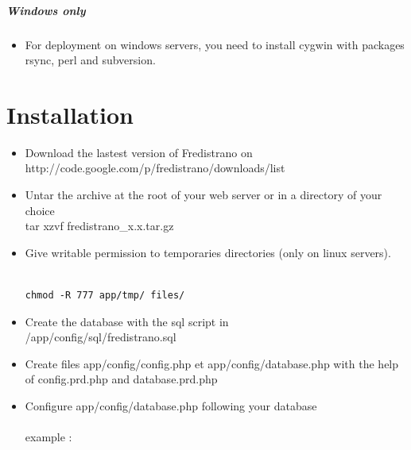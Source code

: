\documentclass[12pt,a4paper]{report}
\begin{document}
\paragraph*{Windows only}
\begin{itemize}
\item
For deployment on windows servers, you need to install cygwin with packages rsync, perl and subversion.

\end{itemize}

\chapter{Installation}
\begin{itemize}
\item Download the lastest version of Fredistrano on\\ http://code.google.com/p/fredistrano/downloads/list
\item Untar the archive at the root of your web server or in a directory of your choice \: \\
tar xzvf fredistrano\_x.x.tar.gz \\
\item Give writable permission to temporaries directories (only on linux servers).\\
\begin{verbatim}

chmod -R 777 app/tmp/ files/

\end{verbatim}

\item Create the database with the sql script in\\ /app/config/sql/fredistrano.sql\\
\item Create files app/config/config.php et app/config/database.php with the help of config.prd.php and database.prd.php\newpage

\item Configure app/config/database.php following your database\\\\example :\\

\lstset{language=Php}
\lstset{commentstyle=\textit}


\end{itemize}
\end{document}

